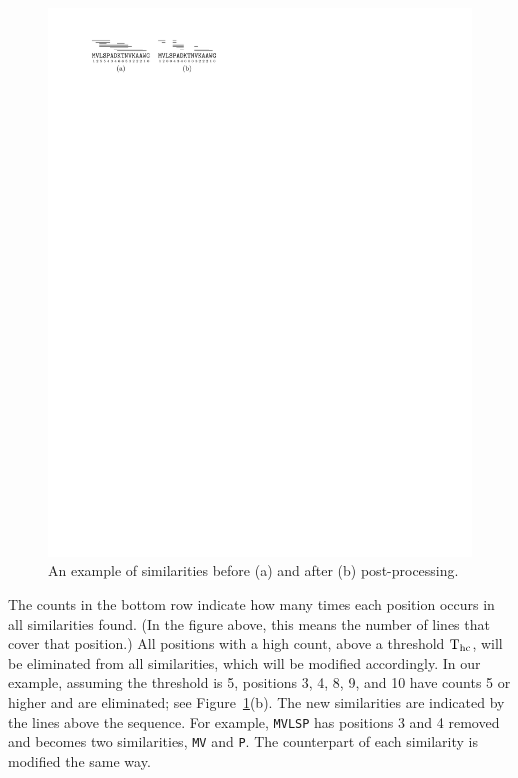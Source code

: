 \begin{figure}[h!]
\centering
\includegraphics{img/fig_similarities.pdf}
\caption{An example of similarities before (a) and after (b) post-processing.\label{fig_similarities}}
\end{figure}

The counts in the bottom row indicate how many times each position occurs in all similarities found. (In the figure above, this means the number of lines that cover that position.) All positions with a high count, above a threshold $\operatorname{T_{\rm hc}}$, will be eliminated from all similarities, which will be modified accordingly. In our example, assuming the threshold is 5, positions 3, 4, 8, 9, and 10 have counts 5 or higher and are eliminated; see Figure~\ref{fig_similarities}(b). The new similarities are indicated by the lines above the sequence. For example, {\tt MVLSP} has positions 3 and 4 removed and becomes two similarities, {\tt MV} and {\tt P}. The counterpart of each similarity is modified the same way.

